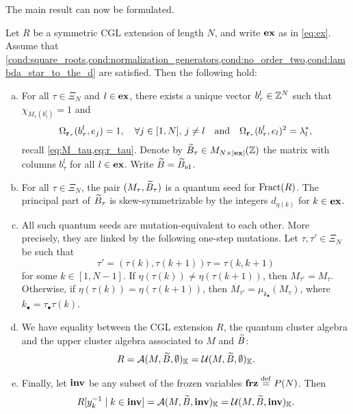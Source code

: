The main result can now be formulated.
\begin{theorem}\label{thm:gy_main_result}

	Let $R$ be a symmetric CGL extension of length $N$, and write $\mathbf{ex}$ as in \cref{eq:ex}.
	Assume that
	\cref{cond:square_roots,cond:normalization_generators,cond:no_order_two,cond:lambda_star_to_the_d}
	are satisfied. Then the following hold:
	\begin{enumerate}[(a)]
		\item For all $\tau \in \Xi_N$ and $l \in \mathbf{ex}$, there exists a unique vector $b^l_{\tau}\in
			      \mathbb{Z}^N$ such that $\chi_{M_\tau (b^l_\tau)} = 1$ and
		      \begin{equation*}
			      \Omega_{\mathbf{r}_\tau}(b^l_\tau, e_j) = 1, \quad \forall j\in [1, N],\,j\neq l \quad \text{and} \quad \Omega_{\mathbf{r}_\tau}(b^l_{\tau}, e_l)^2 = \lambda_l^*,
		      \end{equation*}
		      recall \cref{eq:M_tau,eq:r_tau}.
		      Denote by $\widetilde{B}_\tau \in M_{N \times |\mathbf{ex}|}(\mathbb{Z})$ the matrix with columns $b^l_\tau$
		      for all $l \in \mathbf{ex}$. Write $\widetilde{B} = \widetilde{B}_{\operatorname{id}}$.
		\item For all $\tau \in \Xi_N$, the pair $(M_\tau, \widetilde{B}_\tau)$ is a quantum seed for
		      $\operatorname{Fract}(R)$. The principal part of $\widetilde{B}_\tau$ is skew-symmetrizable by the integers
		      $d_{\eta(k)}$ for $k \in \mathbf{ex}$.
		\item All such quantum seeds are mutation-equivalent to each other. More precisely, they are
		      linked by the following one-step mutations. Let $\tau, \tau' \in \Xi_N$ be such that
		      \begin{equation*}
			      \tau' = (\tau(k), \tau(k+1))\tau = \tau (k, k+1)
		      \end{equation*}
		      for some $k\in [1, N-1]$. If $\eta(\tau(k)) \neq \eta(\tau(k+1))$, then $M_{\tau'} = M_\tau$. Otherwise, if $\eta(\tau(k)) = \eta(\tau(k+1))$, then $M_{\tau'} = \mu_{k_\bullet}(M_\tau)$, where $k_\bullet = \tau_\bullet \tau(k)$.
		\item We have equality between the CGL extension $R$, the quantum cluster algebra and the
		      upper cluster algebra associated to $M$ and $\widetilde{B}$:
		      \begin{equation*}
			      R = \mathcal{A}(M, \widetilde{B}, \emptyset)_{\mathbb{K}} = \mathcal{U}(M, \widetilde{B}, \emptyset)_{\mathbb{K}}.
		      \end{equation*}
		\item Finally, let $\mathbf{inv}$ be any subset of the frozen variables $\mathbf{frz} \overset{\mathrm{def}}{=} P(N)$. Then
		      \begin{equation*}
			      R[y_k^{-1} \mid k \in \mathbf{inv}] = \mathcal{A}(M, \widetilde{B}, \mathbf{inv})_{\mathbb{K}} = \mathcal{U}(M, \widetilde{B}, \mathbf{inv})_{\mathbb{K}}.
		      \end{equation*}
	\end{enumerate}
\end{theorem}

